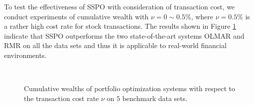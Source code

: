 \documentclass[twoside,11pt]{article}
\begin{document}
To test the effectiveness of SSPO with consideration of transaction cost, we conduct experiments of cumulative wealth with $\nu=0\sim0.5\%$, where $\nu=0.5\%$ is a rather high cost rate for stock transactions. The results shown in Figure \ref{fig:tc} indicate that SSPO outperforms the two state-of-the-art systems OLMAR and RMR on all the data sets and thus it is applicable to real-world financial environments.

\begin{figure}[!htb]
\centering
{}
\\
\caption{Cumulative wealths of portfolio optimization systems with respect to the transaction cost rate $\nu$ on $5$ benchmark data sets.}
\label{fig:tc}
\end{figure}
\end{document}
